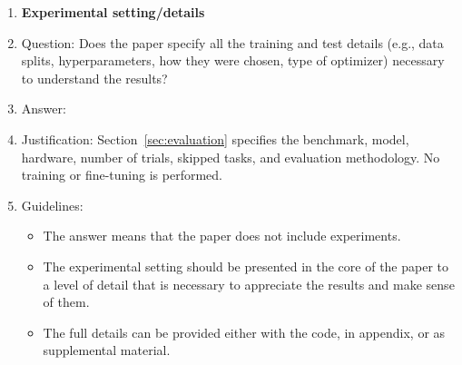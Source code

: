 \documentclass{article}
\begin{document}
\begin{enumerate}
\item {\bf Experimental setting/details}
    \item[] Question: Does the paper specify all the training and test details (e.g., data splits, hyperparameters, how they were chosen, type of optimizer) necessary to understand the results?
    \item[] Answer: \answerYes{}
    \item[] Justification: Section~\ref{sec:evaluation} specifies the benchmark, model, hardware, number of trials, skipped tasks, and evaluation methodology. No training or fine-tuning is performed.
    \item[] Guidelines:
    \begin{itemize}
        \item The answer \answerNA{} means that the paper does not include experiments.
        \item The experimental setting should be presented in the core of the paper to a level of detail that is necessary to appreciate the results and make sense of them.
        \item The full details can be provided either with the code, in appendix, or as supplemental material.
    \end{itemize}


\end{enumerate}
\end{document}
